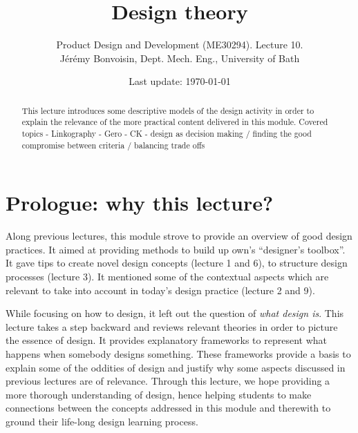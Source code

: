 \documentclass{article}
\begin{document}
\title{Design theory}

\author{Product Design and Development (ME30294). Lecture 10. \\ Jérémy Bonvoisin, Dept. Mech. Eng., University of Bath}
\date{Last update: \today}

\maketitle

\begin{abstract}
This lecture introduces some descriptive models of the design activity in order to explain the relevance of the more practical content delivered in this module. 
Covered topics
- Linkography 
- Gero
- CK
- design as decision making / finding the good compromise between criteria / balancing trade offs
\end{abstract}

\tableofcontents

\section{Prologue: why this lecture?}
\label{sec:prologue}
Along previous lectures, this module strove to provide an overview of good design practices. It aimed at providing methods to build up own's ``designer's toolbox''. It gave tips to create novel design concepts (lecture 1 and 6), to structure design processes (lecture 3). It mentioned some of the contextual aspects which are relevant to take into account in today's design practice (lecture 2 and 9). 

While focusing on how to design, it left out the question of \emph{what design is}. This lecture takes a step backward and reviews relevant theories in order to picture the essence of design. It provides explanatory frameworks to represent what happens when somebody designs something. These frameworks provide a basis to explain some of the oddities of design and justify why some aspects discussed in previous lectures are of relevance. Through this lecture, we hope providing a more thorough understanding of design, hence helping students to make connections between the concepts addressed in this module and therewith to ground their life-long design learning process.

\end{document}
